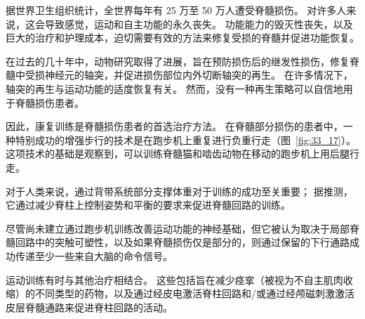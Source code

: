 \begin{proposition}[康复训练可改善人类脊髓损伤后的行走] \label{box:33_4}
	
	\quad \quad 据世界卫生组织统计，全世界每年有 25 万至 50 万人遭受脊髓损伤。
	对许多人来说，这会导致感觉，运动和自主功能的永久丧失。
	功能能力的毁灭性丧失，以及巨大的治疗和护理成本，迫切需要有效的方法来修复受损的脊髓并促进功能恢复。
	
	\quad \quad 在过去的几十年中，动物研究取得了进展，旨在预防损伤后的继发性损伤，修复脊髓中受损神经元的轴突，并促进损伤部位内外切断轴突的再生。
	在许多情况下，轴突的再生与运动功能的适度恢复有关。
	然而，没有一种再生策略可以自信地用于脊髓损伤患者。
	
	\quad \quad 因此，康复训练是脊髓损伤患者的首选治疗方法。
	在脊髓部分损伤的患者中，一种特别成功的增强步行的技术是在跑步机上重复进行负重行走（图~\ref{fig:33_17}）。
	这项技术的基础是观察到，可以训练脊髓猫和啮齿动物在移动的跑步机上用后腿行走。
	
	\quad \quad 对于人类来说，通过背带系统部分支撑体重对于训练的成功至关重要；
	据推测，它通过减少脊柱上控制姿势和平衡的要求来促进脊髓回路的训练。
	
	\quad \quad 尽管尚未建立通过跑步机训练改善运动功能的神经基础，但它被认为取决于局部脊髓回路中的突触可塑性，以及如果脊髓损伤仅是部分的，则通过保留的下行通路成功传递至少一些来自大脑的命令信号。
	
	\quad \quad 运动训练有时与其他治疗相结合。
	这些包括旨在减少痉挛（被视为不自主肌肉收缩）的不同类型的药物，以及通过经皮电激活脊柱回路和/或通过经颅磁刺激激活皮层脊髓通路来促进脊柱回路的活动。
	
\end{proposition}



